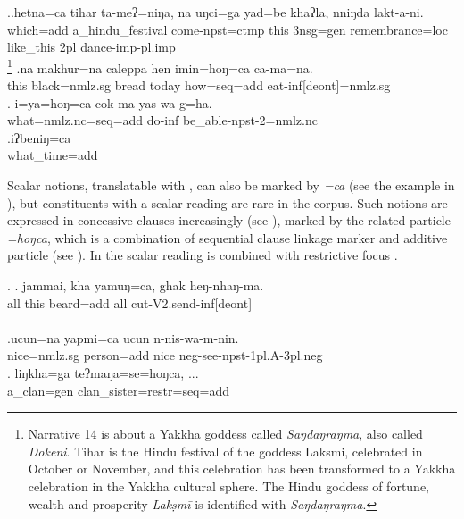 \ex.\ag.hetna=ca  tihar ta-meʔ=niŋa,  na uŋci=ga    yad=be khaʔla,   nniŋda lakt-a-ni.\\
which{\sc =add} a\_hindu\_festival come{\sc [3sg]-npst=ctmp} this {\sc 3nsg=gen} remembrance{\sc =loc} like\_this {\sc 2pl} dance{\sc -imp-pl.imp}\\
\footnote{Narrative 14 is about a Yakkha goddess called \emph{Saŋdaŋraŋma}, also called \emph{Dokeni}. Tihar is the Hindu festival of the goddess Laksmi, celebrated in October or November, and this celebration  has been transformed to a Yakkha celebration in the Yakkha cultural sphere. The Hindu goddess of fortune, wealth  and prosperity \emph{Lakṣmī } is identified with \emph{Saŋdaŋraŋma}.}
\bg.na   makhur=na        caleppa hen   imin=hoŋ=ca          ca-ma=na.\\
this black{\sc =nmlz.sg} bread today how{\sc =seq=add} eat{\sc -inf[deont]=nmlz.sg}\\
 
\bg. i=ya=hoŋ=ca                       cok-ma     yas-wa-g=ha.\\
what{\sc =nmlz.nc=seq=add} do{\sc -inf} be\_able{\sc -npst-2=nmlz.nc}\\
 
 \bg.iʔbeniŋ=ca\\
 what\_time{\sc =add}\\
  
  
 Scalar notions,  translatable with , can also be marked by \emph{=ca} (see the example in \Next), but constituents with a  scalar reading are rare in the corpus. Such notions are expressed in concessive clauses increasingly (see ), marked by the related particle \emph{=hoŋca}, which is a combination of sequential clause linkage marker and additive particle (see \Next[c]). In \Next[c] the scalar reading is combined with restrictive focus . 
 
 \ex. \ag.      jammai, kha  yamuŋ=ca,       ghak heŋ-nhaŋ-ma. \\
 all this beard{\sc =add} all cut{\sc -V2.send-inf[deont]}\\
   \\
 \bg.ucun=na        yapmi=ca         ucun n-nis-wa-m-nin.\\
 nice{\sc =nmlz.sg} person{\sc =add} nice {\sc neg-}see{\sc -npst-1pl.A-3pl.neg}\\
   
 \bg. liŋkha=ga      teʔmaŋa=se=hoŋca, ...\\
 a\_clan{\sc =gen} clan\_sister{\sc =restr=seq=add}\\
  
 
